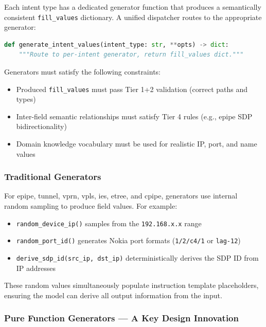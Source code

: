 \documentclass[12pt, a4paper]{article}
\newcommand{\fillvalues}{\texttt{fill\_values}}
\begin{document}
Each intent type has a dedicated generator function that produces a semantically consistent \fillvalues{} dictionary. A unified dispatcher routes to the appropriate generator:

\begin{lstlisting}[language=Python, caption={Unified dispatch interface}]
def generate_intent_values(intent_type: str, **opts) -> dict:
    """Route to per-intent generator, return fill_values dict."""
\end{lstlisting}

\noindent
Generators must satisfy the following constraints:

\begin{itemize}
  \item Produced \fillvalues{} must pass Tier 1+2 validation (correct paths and types)
  \item Inter-field semantic relationships must satisfy Tier 4 rules (e.g., epipe SDP bidirectionality)
  \item Domain knowledge vocabulary must be used for realistic IP, port, and name values
\end{itemize}

\subsubsection{Traditional Generators}

For epipe, tunnel, vprn, vpls, ies, etree, and cpipe, generators use internal random sampling to produce field values. For example:

\begin{itemize}
  \item \texttt{random\_device\_ip()} samples from the \texttt{192.168.x.x} range
  \item \texttt{random\_port\_id()} generates Nokia port formats (\texttt{1/2/c4/1} or \texttt{lag-12})
  \item \texttt{derive\_sdp\_id(src\_ip, dst\_ip)} deterministically derives the SDP ID from IP addresses
\end{itemize}

These random values simultaneously populate instruction template placeholders, ensuring the model can derive all output information from the input.

\subsubsection{Pure Function Generators --- A Key Design Innovation}
\label{sec:pure-function}
\end{document}

